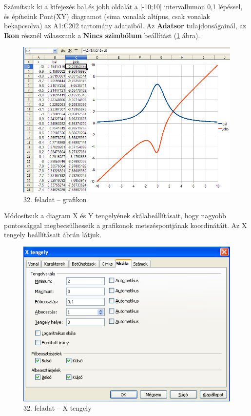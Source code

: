 Számítsuk ki a kifejezés bal és jobb oldalát a [-10;10]
intervallumon 0,1 lépéssel, és építsünk Pont(XY) diagramot
(sima vonalak altípus, csak vonalak bekapcsolva) az A1:C202
tartomány adataiból. Az \textbf{Adatsor} tulajdonságainál, az
\textbf{Ikon} résznél válasszunk a \textbf{Nincs szimbólum}
beállítást (\ref{32-feladatGrafikon} ábra).

\begin{figure}[!h]
\begin{center}
\includegraphics[width=15.999cm]{oocalcv2-img142.png}
\caption{32. feladat -- grafikon}\label{32-feladatGrafikon}
\end{center}
\end{figure}

Módosítsuk a diagram X és Y tengelyének
skálabeállításait, hogy nagyobb pontossággal
megbecsülhessük a grafikonok metszéspontjának koordinátáit.
Az X tengely beállításait  ábrán látjuk.

\begin{figure}[!h]
\begin{center}
\includegraphics[width=12.917cm]{oocalcv2-img143.png}
\caption{32. feladat --  X tengely}\label{32-feladatXtengely}
\end{center}
\end{figure}


